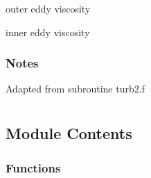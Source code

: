 \documentclass[letterpaper,10pt,english]{sphinxmanual}
\begin{document}
\begin{fulllineitems}
\begin{fulllineitems}
\end{fulllineitems}


\begin{fulllineitems}
\label{\detokenize{autoapi/BaldwinLomax/index:BaldwinLomax.amuto}}
\sphinxAtStartPar
outer eddy viscosity

\end{fulllineitems}


\begin{fulllineitems}
\label{\detokenize{autoapi/BaldwinLomax/index:BaldwinLomax.amuti}}
\sphinxAtStartPar
inner eddy viscosity

\end{fulllineitems}

\subsubsection*{Notes}

\sphinxAtStartPar
Adapted from subroutine turb2.f

\end{fulllineitems}



\section{}
\label{\detokenize{autoapi/bcfar/index:module-bcfar}}\label{\detokenize{autoapi/bcfar/index:bcfar}}\label{\detokenize{autoapi/bcfar/index::doc}}

\subsection{Module Contents}
\label{\detokenize{autoapi/bcfar/index:module-contents}}

\subsubsection{Functions}
\label{\detokenize{autoapi/bcfar/index:functions}}
\end{document}
